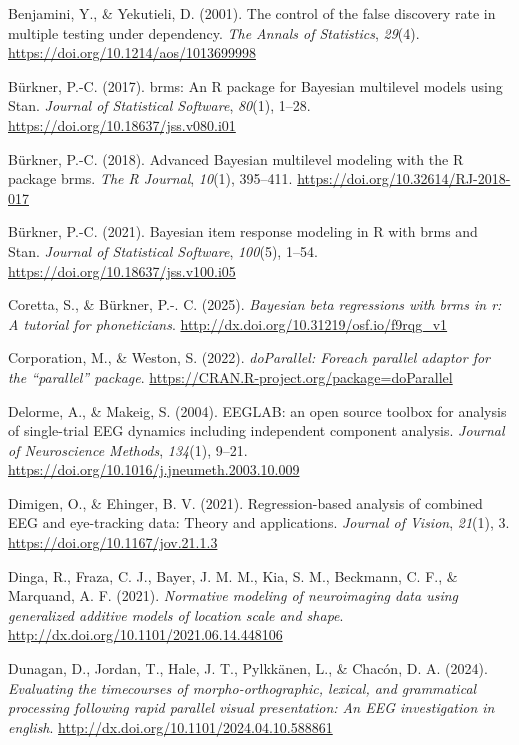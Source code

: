 \documentclass[
  man,
  floatsintext,
  longtable,
  a4paper,
  nolmodern,
  notxfonts,
  notimes,
  colorlinks=true,linkcolor=blue,citecolor=blue,urlcolor=blue]{apa7}
\newlength{\cslhangindent}
\newenvironment{CSLReferences}[2] %
 {\begin{list}{}{%
  \setlength{\itemindent}{0pt}
  \setlength{\leftmargin}{0pt}
  \setlength{\parsep}{0pt}
  \ifodd #1
   \setlength{\leftmargin}{\cslhangindent}
   \setlength{\itemindent}{-1\cslhangindent}
  \fi
  \setlength{\itemsep}{#2\baselineskip}}}
 {\end{list}}
\begin{document}
\begin{CSLReferences}{1}{0}
Benjamini, Y., \& Yekutieli, D. (2001). The control of the false
discovery rate in multiple testing under dependency. \emph{The Annals of
Statistics}, \emph{29}(4). \url{https://doi.org/10.1214/aos/1013699998}

Bürkner, P.-C. (2017). {brms}: An {R} package for {Bayesian} multilevel
models using {Stan}. \emph{Journal of Statistical Software},
\emph{80}(1), 1--28. \url{https://doi.org/10.18637/jss.v080.i01}

Bürkner, P.-C. (2018). Advanced {Bayesian} multilevel modeling with the
{R} package {brms}. \emph{The R Journal}, \emph{10}(1), 395--411.
\url{https://doi.org/10.32614/RJ-2018-017}

Bürkner, P.-C. (2021). Bayesian item response modeling in {R} with
{brms} and {Stan}. \emph{Journal of Statistical Software},
\emph{100}(5), 1--54. \url{https://doi.org/10.18637/jss.v100.i05}

Coretta, S., \& Bürkner, P.-. C. (2025). \emph{Bayesian beta regressions
with brms in r: A tutorial for phoneticians}.
\url{http://dx.doi.org/10.31219/osf.io/f9rqg_v1}

Corporation, M., \& Weston, S. (2022). \emph{{doParallel}: Foreach
parallel adaptor for the {``{parallel}''} package}.
\url{https://CRAN.R-project.org/package=doParallel}

Delorme, A., \& Makeig, S. (2004). EEGLAB: an open source toolbox for
analysis of single-trial EEG dynamics including independent component
analysis. \emph{Journal of Neuroscience Methods}, \emph{134}(1), 9--21.
\url{https://doi.org/10.1016/j.jneumeth.2003.10.009}

Dimigen, O., \& Ehinger, B. V. (2021). Regression-based analysis of
combined EEG and eye-tracking data: Theory and applications.
\emph{Journal of Vision}, \emph{21}(1), 3.
\url{https://doi.org/10.1167/jov.21.1.3}

Dinga, R., Fraza, C. J., Bayer, J. M. M., Kia, S. M., Beckmann, C. F.,
\& Marquand, A. F. (2021). \emph{Normative modeling of neuroimaging data
using generalized additive models of location scale and shape}.
\url{http://dx.doi.org/10.1101/2021.06.14.448106}

Dunagan, D., Jordan, T., Hale, J. T., Pylkkänen, L., \& Chacón, D. A.
(2024). \emph{Evaluating the timecourses of morpho-orthographic,
lexical, and grammatical processing following rapid parallel visual
presentation: An EEG investigation in english}.
\url{http://dx.doi.org/10.1101/2024.04.10.588861}


\end{CSLReferences}
\end{document}
